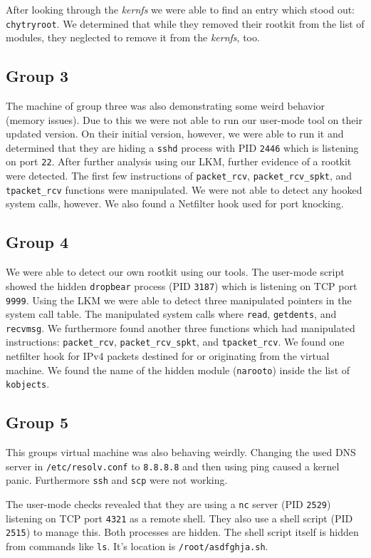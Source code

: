 \documentclass[10pt, letterpaper]{scrartcl}
\begin{document}
After looking through the \emph{kernfs} we were able to find an entry which stood out: \texttt{chytryroot}.
We determined that while they removed their rootkit from the list of modules, they neglected to remove it from the \emph{kernfs}, too.

\subsection{Group 3}
The machine of group three was also demonstrating some weird behavior (memory issues).
Due to this we were not able to run our user-mode tool on their updated version.
On their initial version, however, we were able to run it and determined that they are hiding a \texttt{sshd} process with PID \texttt{2446} which is listening on port \texttt{22}.
After further analysis using our LKM, further evidence of a rootkit were detected.
The first few instructions of \texttt{packet\_rcv}, \texttt{packet\_rcv\_spkt}, and \texttt{tpacket\_rcv} functions were manipulated.
We were not able to detect any hooked system calls, however.
We also found a Netfilter hook used for port knocking.

\subsection{Group 4}
We were able to detect our own rootkit using our tools.
The user-mode script showed the hidden \texttt{dropbear} process (PID \texttt{3187}) which is listening on TCP port \texttt{9999}.
Using the LKM we were able to detect three manipulated pointers in the system call table. The manipulated system calls where \texttt{read}, \texttt{getdents}, and \texttt{recvmsg}. We furthermore found another three functions which had manipulated instructions: \texttt{packet\_rcv}, \texttt{packet\_rcv\_spkt}, and \texttt{tpacket\_rcv}.
We found one netfilter hook for IPv4 packets destined for or originating from the virtual machine.
We found the name of the hidden module (\texttt{narooto}) inside the list of \texttt{kobjects}.

\subsection{Group 5}
This groups virtual machine was also behaving weirdly.
Changing the used DNS server in \texttt{/etc/resolv.conf} to \texttt{8.8.8.8} and then using ping caused a kernel panic.
Furthermore \texttt{ssh} and \texttt{scp} were not working.

The user-mode checks revealed that they are using a \texttt{nc} server (PID \texttt{2529}) listening on TCP port \texttt{4321} as a remote shell.
They also use a shell script (PID \texttt{2515}) to manage this.
Both processes are hidden.
The shell script itself is hidden from commands like \texttt{ls}. It's location is \texttt{/root/asdfghja.sh}.
\end{document}
